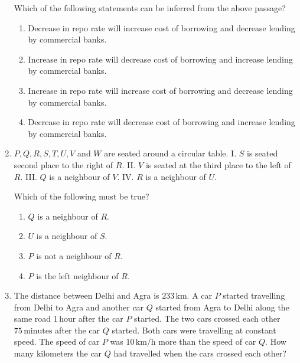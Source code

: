 \documentclass[journal,12pt,onecolumn]{IEEEtran}
\theoremstyle{remark}
\begin{document}
\begin{enumerate}[start=1, label=Q.\arabic*]
Which of the following statements can be inferred from the above passage?

\begin{enumerate}
\item Decrease in repo rate will increase cost of borrowing and decrease lending by commercial banks.  
\item Increase in repo rate will decrease cost of borrowing and increase lending by commercial banks.  
\item Increase in repo rate will increase cost of borrowing and decrease lending by commercial banks.  
\item Decrease in repo rate will decrease cost of borrowing and increase lending by commercial banks.  
\end{enumerate}

\hfill{}

\item $P, Q, R, S, T, U, V$ and $W$ are seated around a circular table.  
I. $S$ is seated second place to the right of $R$.  
II. $V$ is seated at the third place to the left of $R$.  
III. $Q$ is a neighbour of $V$.  
IV. $R$ is a neighbour of $U$.  

Which of the following must be true?

\begin{enumerate}
\item $Q$ is a neighbour of $R$.  
\item $U$ is a neighbour of $S$.  
\item $P$ is not a neighbour of $R$.  
\item $P$ is the left neighbour of $R$.  
\end{enumerate}

\hfill{}

\item The distance between Delhi and Agra is $233 \, \text{km}$. A car $P$ started travelling from Delhi to Agra and another car $Q$ started from Agra to Delhi along the same road $1 \, \text{hour}$ after the car $P$ started. The two cars crossed each other $75 \, \text{minutes}$ after the car $Q$ started. Both cars were travelling at constant speed. The speed of car $P$ was $10 \, \text{km/h}$ more than the speed of car $Q$. How many kilometers the car $Q$ had travelled when the cars crossed each other?

\begin{enumerate}
\end{enumerate}


\end{enumerate}
\end{document}
